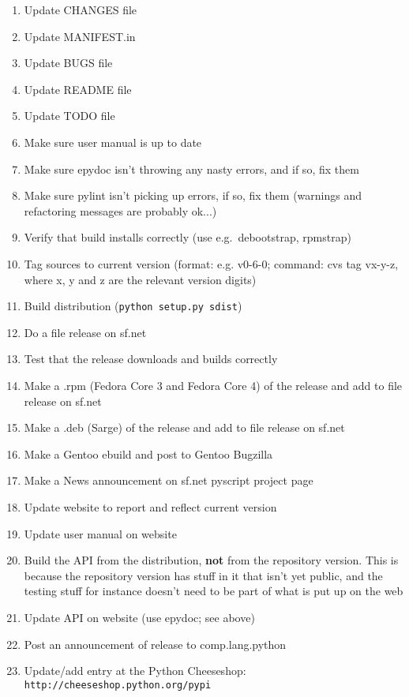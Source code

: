 \documentclass[12pt,a4paper]{article}
\begin{document}
\begin{enumerate}
\item Update CHANGES file
\item Update MANIFEST.in
\item Update BUGS file
\item Update README file
\item Update TODO file
\item Make sure user manual is up to date
\item Make sure epydoc isn't throwing any nasty errors, and if so, fix them
\item Make sure pylint isn't picking up errors, if so, fix them (warnings
and refactoring messages are probably ok...)
\item Verify that build installs correctly (use e.g.~debootstrap, rpmstrap)
\item Tag sources to current version (format: e.g. v0-6-0; command: cvs tag
vx-y-z, where x, y and z are the relevant version digits)
\item Build distribution (\texttt{python setup.py sdist})
\item Do a file release on sf.net
\item Test that the release downloads and builds correctly
\item Make a .rpm (Fedora Core 3 and Fedora Core 4) of the release and 
add to file release on sf.net
\item Make a .deb (Sarge) of the release and add to file release on sf.net
\item Make a Gentoo ebuild and post to Gentoo Bugzilla
\item Make a News announcement on sf.net pyscript project page
\item Update website to report and reflect current version
\item Update user manual on website
\item Build the API from the distribution, \textbf{not} from the repository 
version.  This is because the repository version has stuff in it that isn't
yet public, and the testing stuff for instance doesn't need to be part of
what is put up on the web
\item Update API on website (use epydoc; see above)
\item Post an announcement of release to comp.lang.python
\item Update/add entry at the Python Cheeseshop:
\texttt{http://cheeseshop.python.org/pypi}
\end{enumerate}
\end{document}
